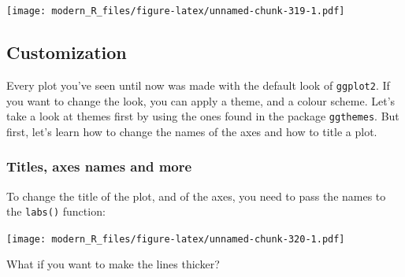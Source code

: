 \documentclass[]{gitbook}
\newenvironment{Shaded}{\begin{snugshade}}{\end{snugshade}}
\newcommand{\DataTypeTok}[1]{\textcolor[rgb]{0.13,0.29,0.53}{#1}}
\newcommand{\KeywordTok}[1]{\textcolor[rgb]{0.13,0.29,0.53}{\textbf{#1}}}
\newcommand{\NormalTok}[1]{#1}
\newcommand{\OperatorTok}[1]{\textcolor[rgb]{0.81,0.36,0.00}{\textbf{#1}}}
\newcommand{\StringTok}[1]{\textcolor[rgb]{0.31,0.60,0.02}{#1}}
\theoremstyle{definition}
\theoremstyle{definition}
\theoremstyle{definition}
\theoremstyle{remark}
\begin{document}
\texttt{[image: modern\_R\_files/figure-latex/unnamed-chunk-319-1.pdf]}

\hypertarget{customization}{%
\subsection{Customization}\label{customization}}

Every plot you've seen until now was made with the default look of
\texttt{ggplot2}. If you want to change the look, you can apply a theme,
and a colour scheme. Let's take a look at themes first by using the ones
found in the package \texttt{ggthemes}. But first, let's learn how to
change the names of the axes and how to title a plot.

\hypertarget{titles-axes-names-and-more}{%
\subsubsection{Titles, axes names and
more}\label{titles-axes-names-and-more}}

To change the title of the plot, and of the axes, you need to pass the
names to the \texttt{labs()} function:

\begin{Shaded}
\end{Shaded}

\texttt{[image: modern\_R\_files/figure-latex/unnamed-chunk-320-1.pdf]}

What if you want to make the lines thicker?
\end{document}
